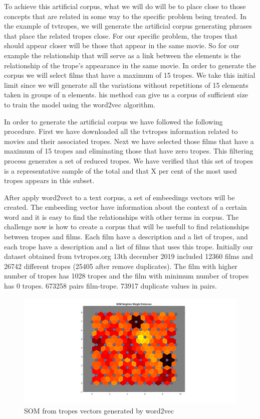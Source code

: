 \documentclass[letterpaper]{article}
\begin{document}
To achieve this artificial corpus, what we will do will be to place
close to those concepts that are related in some way to the specific
problem being treated. In the example of tvtropes, we will generate
the artificial corpus generating phrases that place the related tropes
close. For our specific problem, the tropes that should appear closer
will be those that appear in the same movie. So for our example the
relationship that will serve as a link between the elements is the
relationship of the trope's appearance in the same movie. In order to
generate the corpus we will select films that have a maximum of 15
tropes. We take this initial limit since we will generate all the
variations without repetitions of 15 elements taken in groups of n
elements. his method can give us a corpus of sufficient size to train
the model using the word2vec algorithm. 

In order to generate the artificial corpus we have followed the following procedure. First we have downloaded all the tvtropes information related to movies and their associated tropes. Next we have selected those films that have a maximum of 15 tropes and eliminating those that have zero tropes. This filtering process generates a set of reduced tropes. We have verified that this set of tropes is a representative sample of the total and that X per cent of the most used tropes appears in this subset.



 
After apply word2vect to a text corpus, a set of embeedings vectors will be created. The embeeding vector have information about the context of a certain word and it is easy to find the relationships with other terms in corpus. The challenge now is how to create a corpus that will be usefull to find relationships between tropes and films. Each film have a description and a list of tropes, and each trope have a description and a list of films that uses this trope. Initially our dataset obtained from tvtropes.org 13th december 2019 included 12360 films and 26742 different tropes (25405 after remove duplicates). The film with higher number of tropes has 1028 tropes and the film with minimum number of tropes has 0 tropes. 673258 pairs film-trope. 73917 duplicate values in pairs. 


\begin{figure}
	\centering
	\includegraphics[width=1.25\linewidth]{../images/som_matlab_tropes_15_9}
	\caption{SOM from tropes vectors generated by word2vec}
	\label{fig:sommatlabtropes159}
\end{figure}
\end{document}
